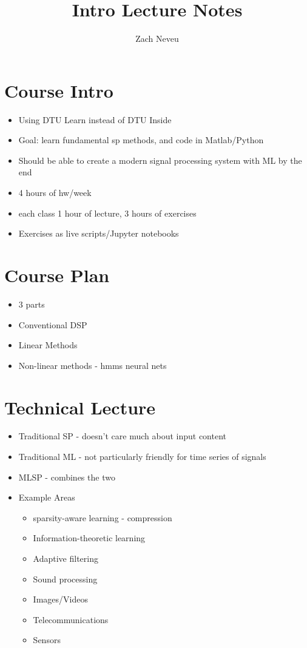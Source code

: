 \documentclass[12pt, letter]{article}
\author{Zach Neveu}
\title{ Intro Lecture Notes }
\begin{document}
\maketitle

\section{Course Intro}%
\label{sec:course_intro}
\begin{itemize}
	\item Using DTU Learn instead of DTU Inside
	\item Goal: learn fundamental sp methods, and code in Matlab/Python
	\item Should be able to create a modern signal processing system with ML by the end
	\item 4 hours of hw/week
	\item each class 1 hour of lecture, 3 hours of exercises
	\item Exercises as live scripts/Jupyter notebooks
\end{itemize}

\section{Course Plan}%
\label{sec:course_plan}

\begin{itemize}
	\item 3 parts
	\item Conventional DSP
	\item Linear Methods
	\item Non-linear methods - hmms neural nets
\end{itemize}

\section{Technical Lecture}%
\label{sec:technical_lecture}
\begin{itemize}
	\item Traditional SP - doesn't care much about input content
	\item Traditional ML - not particularly friendly for time series of signals
	\item MLSP - combines the two
	\item Example Areas
	\begin{itemize}
		\item sparsity-aware learning - compression
		\item Information-theoretic learning
		\item Adaptive filtering
		\item Sound processing
		\item Images/Videos
		\item Telecommunications
		\item Sensors
	\end{itemize}
\end{itemize}
\end{document}
